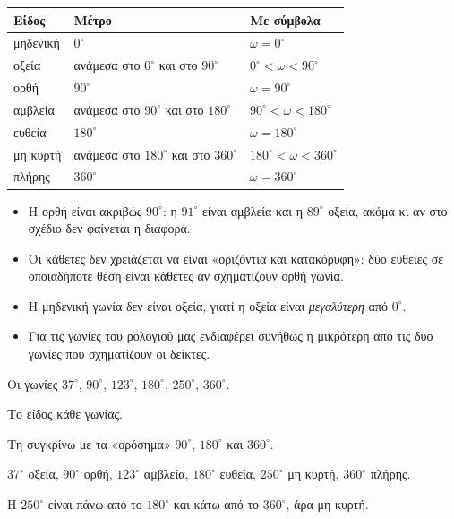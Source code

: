 \renewcommand{\arraystretch}{1.4}
\begin{center}
\begin{tabular}{@{}lll@{}}
\toprule
\textbf{Είδος} & \textbf{Μέτρο} & \textbf{Με σύμβολα}\\
\midrule
μηδενική & $0^\circ$ & $\omega=0^\circ$\\
οξεία & ανάμεσα στο $0^\circ$ και στο $90^\circ$ & $0^\circ<\omega<90^\circ$\\
ορθή & $90^\circ$ & $\omega=90^\circ$\\
αμβλεία & ανάμεσα στο $90^\circ$ και στο $180^\circ$ & $90^\circ<\omega<180^\circ$\\
ευθεία & $180^\circ$ & $\omega=180^\circ$\\
μη κυρτή & ανάμεσα στο $180^\circ$ και στο $360^\circ$ & $180^\circ<\omega<360^\circ$\\
πλήρης & $360^\circ$ & $\omega=360^\circ$\\
\bottomrule
\end{tabular}
\end{center}

\begin{prosoxi}
\begin{itemize}[leftmargin=1.2em,itemsep=0.3ex,topsep=2pt]
\item Η ορθή είναι ακριβώς $90^\circ$: η $91^\circ$ είναι αμβλεία και η $89^\circ$ οξεία, ακόμα κι αν στο σχέδιο δεν φαίνεται η διαφορά.
\item Οι κάθετες δεν χρειάζεται να είναι «οριζόντια και κατακόρυφη»: δύο ευθείες σε οποιαδήποτε θέση είναι κάθετες αν σχηματίζουν ορθή γωνία.
\item Η μηδενική γωνία δεν είναι οξεία, γιατί η οξεία είναι \emph{μεγαλύτερη} από $0^\circ$.
\item Για τις γωνίες του ρολογιού μας ενδιαφέρει συνήθως η μικρότερη από τις δύο γωνίες που σχηματίζουν οι δείκτες.
\end{itemize}
\end{prosoxi}


\tixero Οι γωνίες $37^\circ$, $90^\circ$, $123^\circ$, $180^\circ$, $250^\circ$, $360^\circ$.\par
\tithelo Το είδος κάθε γωνίας.\par
\possindeo Τη συγκρίνω με τα «ορόσημα» $90^\circ$, $180^\circ$ και $360^\circ$.\par
\apantisi $37^\circ$ οξεία, $90^\circ$ ορθή, $123^\circ$ αμβλεία, $180^\circ$ ευθεία, $250^\circ$ μη κυρτή, $360^\circ$ πλήρης.\par
\elegxos Η $250^\circ$ είναι πάνω από το $180^\circ$ και κάτω από το $360^\circ$, άρα μη κυρτή.

